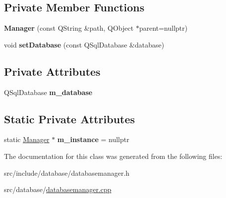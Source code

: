 \subsection*{Private Member Functions}
\begin{DoxyCompactItemize}
\item 
\mbox{\label{classDatabase_1_1Manager_a982ecff1f796f2a87608db4f0d00725a}} 
{\bfseries Manager} (const Q\+String \&path, Q\+Object $\ast$parent=nullptr)
\item 
\mbox{\label{classDatabase_1_1Manager_af7f86ed5807bd6299fe4aa594b72013c}} 
void {\bfseries set\+Database} (const Q\+Sql\+Database \&database)
\end{DoxyCompactItemize}
\subsection*{Private Attributes}
\begin{DoxyCompactItemize}
\item 
\mbox{\label{classDatabase_1_1Manager_a4de33edd790c0d8320c0a2a5990f5169}} 
Q\+Sql\+Database {\bfseries m\+\_\+database}
\end{DoxyCompactItemize}
\subsection*{Static Private Attributes}
\begin{DoxyCompactItemize}
\item 
\mbox{\label{classDatabase_1_1Manager_a35e8446687862c34ae818636f953f54e}} 
static \mbox{\hyperlink{classDatabase_1_1Manager}{Manager}} $\ast$ {\bfseries m\+\_\+instance} = nullptr
\end{DoxyCompactItemize}


The documentation for this class was generated from the following files\+:\begin{DoxyCompactItemize}
\item 
src/include/database/databasemanager.\+h\item 
src/database/\mbox{\hyperlink{databasemanager_8cpp}{databasemanager.\+cpp}}\end{DoxyCompactItemize}
